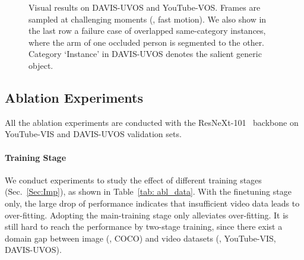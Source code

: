 \documentclass[10pt,twocolumn,letterpaper]{article}
\begin{document}
	\begin{figure*}[t]
		\begin{center}
		\end{center}
		\vspace{-0.1in}
		\caption{Visual results on DAVIS-UVOS and YouTube-VOS. Frames are sampled at challenging moments (\eg, fast motion). We also show in the last row a failure case of overlapped same-category instances, where the arm of one occluded person is segmented to the other. Category `Instance' in DAVIS-UVOS denotes the salient generic object.}
		\label{fig:visu}
		\vspace{-0.05in}
	\end{figure*}
	
	\subsection{Ablation Experiments}\label{Sec:ablation}
	All the ablation experiments are conducted with the ResNeXt-101~\cite{xie2017aggregated} backbone on YouTube-VIS and DAVIS-UVOS validation sets.
	
	
	\begin{table}[t]
		\centering
		\vspace{0.05in}
		\caption{Training data analysis on YouTube-VIS and DAVIS-UVOS validation set. `Both' denotes two-stage training, including main-training and finetuning. We report  for YouTube-VIS and  for DAVIS-UVOS.
		}\label{tab: abl_data}
		\vspace{-0.1in}
	\end{table}
	
	\vspace{-0.15in}
	\paragraph{Training Stage}\label{Sec: trainstage}
	We conduct experiments to study the effect of different training stages (Sec.~\ref{Sec:Imp}), as shown in Table~\ref{tab: abl_data}. With the finetuning stage only, the large drop of performance indicates that insufficient video data leads to over-fitting.
	Adopting the main-training stage only alleviates over-fitting. It is still hard to reach the performance by two-stage training, since there exist a domain gap between image (\ie, COCO) and video datasets (\ie, YouTube-VIS, DAVIS-UVOS).
	
\end{document}
